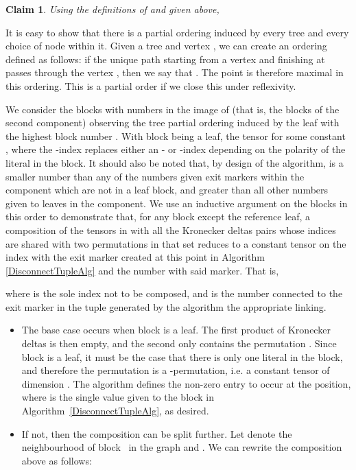 \documentclass{LMCS}
\theoremstyle{plain}\newtheorem*{cLm}{Claim}
\newcommand{\p}{} \newcommand{\N}{\mathbb{N}}
\begin{document}
    \begin{clmenv}
    \begin{cLm}
    Using the definitions of  and  given above, 
    
    \end{cLm}
    \proof
    It is easy to show that there is a partial ordering induced by every tree and every choice of node within it. Given a tree  and vertex , we can create an ordering  defined as follows: if the unique path starting from a vertex  and finishing at  passes through the vertex , then we say that . The point  is therefore maximal in this ordering. This is a partial order if we close this under reflexivity.
    
    \p We consider the blocks with numbers in the image of  (that is, the blocks of the second component) observing the tree partial ordering induced by the leaf with the highest block number . With block  being a leaf, the tensor  for some constant , where the -index replaces either an - or -index depending on the polarity of the literal in the block. It should also be noted that, by design of the algorithm,  is a smaller number than any of the numbers given exit markers within the component which are not in a leaf block, and greater than all other numbers given to leaves in the component. We use an inductive argument on the blocks in this order to demonstrate that, for any block  except the reference leaf, a composition of the tensors in  with all the Kronecker deltas pairs whose indices are shared with two permutations in that set reduces to a constant tensor on the index with the exit marker created at this point in Algorithm \ref{DisconnectTupleAlg} and the number with said marker. That is,
    
    where  is the sole index not to be composed, and  is the number connected to the exit marker in the tuple generated by the algorithm the appropriate linking.
    \begin{itemize}
    \item The base case occurs when block  is a leaf. The first product of Kronecker deltas is then empty, and the second only contains the permutation . Since block  is a leaf, it must be the case that there is only one literal in the block, and therefore the permutation is a -permutation, i.e. a constant tensor of dimension . The algorithm defines the non-zero entry to occur at the  position, where  is the single value given to the block in Algorithm~\ref{DisconnectTupleAlg}, as desired.
    \item If not, then the composition can be split further. Let  denote the neighbourhood of block~ in the graph and . We can rewrite the composition above as follows:
    

\end{itemize}
\end{clmenv}
\end{document}
